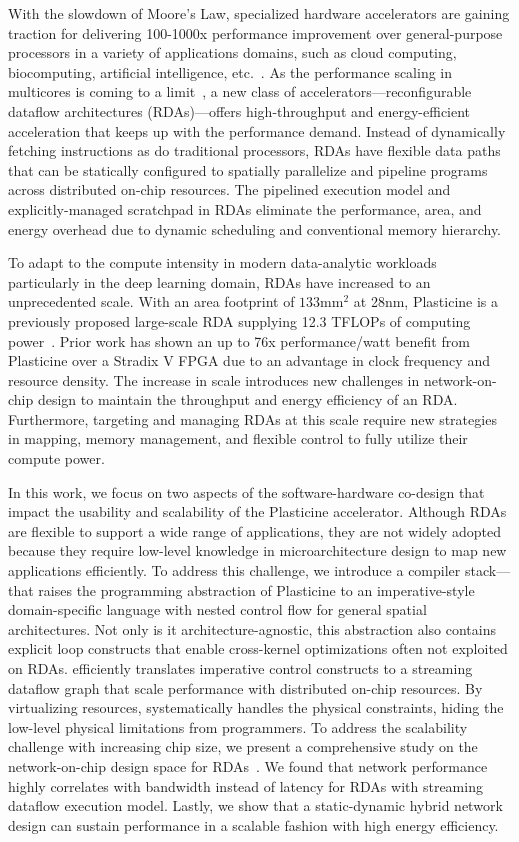 
With the slowdown of Moore’s Law, specialized hardware accelerators are gaining traction for delivering 100-1000x performance improvement over general-purpose processors in a variety of applications domains, such as cloud computing, biocomputing,
artificial intelligence, etc.~\cite{fpgacloudsurvey,bioaccel,genomicaccel}.
As the performance scaling in multicores is coming to a limit~\cite{multicorescale}, a new class of
accelerators---reconfigurable dataflow architectures (RDAs)---offers high-throughput and energy-efficient acceleration that keeps up with the performance demand.
Instead of dynamically fetching instructions as do traditional processors, RDAs have flexible data paths that can be statically configured to spatially parallelize and pipeline programs across
distributed on-chip resources.
The pipelined execution model and explicitly-managed scratchpad in RDAs eliminate the performance, area, and energy overhead due to dynamic scheduling and conventional memory hierarchy.

To adapt to the compute intensity in modern data-analytic workloads particularly in the deep learning domain, RDAs have increased to an unprecedented scale.
With an area footprint of $133\text{mm}^2$ at 28nm,
Plasticine is a previously proposed large-scale RDA supplying 12.3 TFLOPs of computing power~\cite{plasticine}.
Prior work has shown an up to 76x performance/watt benefit from Plasticine over a Stradix V FPGA
due to an advantage in clock frequency and resource density.
The increase in scale introduces new challenges in network-on-chip design to maintain
the throughput and energy efficiency of an RDA.
Furthermore, targeting and managing RDAs at this scale require new strategies in mapping,  memory management, and flexible control to fully utilize their compute power.

In this work, we focus on two aspects of the software-hardware co-design that impact the usability
and scalability of the Plasticine accelerator.
Although RDAs are flexible to support a wide range of applications, they are not widely adopted
because
they require low-level knowledge in microarchitecture design to map new applications efficiently.
To address this challenge, we introduce a compiler stack--\name--that raises the programming abstraction of
Plasticine to an imperative-style domain-specific language with nested control
flow for general spatial architectures.
Not only is it architecture-agnostic, this abstraction also contains explicit loop constructs that enable
cross-kernel optimizations often not exploited on RDAs.
\name efficiently translates imperative control constructs to a streaming
dataflow graph that scale performance with distributed on-chip resources.
By virtualizing resources, \name systematically handles the physical constraints, hiding
the low-level physical limitations from programmers.
To address the scalability challenge with increasing chip size,
we present a comprehensive study on the network-on-chip design space for RDAs~\cite{network}.
We found that network performance highly correlates with bandwidth instead of latency
for RDAs with streaming dataflow execution model.
Lastly, we show that a static-dynamic hybrid network design can sustain performance in a
scalable fashion with high energy efficiency.
